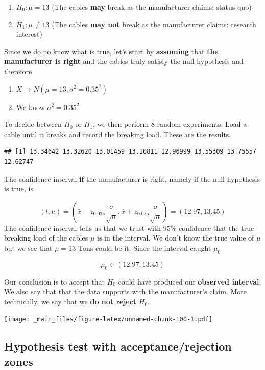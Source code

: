 \documentclass[
]{book}
\providecommand{\tightlist}{%
  \setlength{\itemsep}{0pt}\setlength{\parskip}{0pt}}
\begin{document}
\begin{enumerate}
\def\labelenumi{\alph{enumi}.}
\tightlist
\item
  \(H_0:\mu = 13\) (The cables \textbf{may} break as the manufacturer claims: status quo)
\item
  \(H_1:\mu \neq 13\) (The cables \textbf{may not} break as the manufacturer claims: research interest)
\end{enumerate}

Since we do no know what is true, let's start by \textbf{assuming} that \textbf{the manufacturer is right} and the cables truly satisfy the null hypothesis and therefore

\begin{enumerate}
\def\labelenumi{\arabic{enumi}.}
\tightlist
\item
  \(X \rightarrow N(\mu=13, \sigma^2=0.35^2)\)
\item
  We know \(\sigma^2=0.35^2\)
\end{enumerate}

To decide between \(H_0\) or \(H_1\), we then perform \(8\) random experiments: Load a cable until it breaks and record the breaking load. These are the results.

\begin{verbatim}
## [1] 13.34642 13.32620 13.01459 13.10811 12.96999 13.55309 13.75557 12.62747
\end{verbatim}

The confidence interval \textbf{if} the manufacturer is right, namely if the null hypothesis is true, is

\[(l,u)=(\bar{x}-z_{0.025} \frac{\sigma}{\sqrt{n}}, \bar{x}+z_{0.025} \frac{\sigma}{\sqrt{n}})= (12.97,13.45)\]
The confidence interval tells us that we trust with \(95\%\) confidence that the true breaking load of the cables \(\mu\) is in the interval. We don't know the true value of \(\mu\) but we see that \(\mu=13\) Tons could be it. Since the interval caught \(\mu_0\)

\[\mu_0\in (12.97,13.45)\]

Our conclusion is to accept that \(H_0\) could have produced our \textbf{observed interval}. We also say that that the data supports with the manufacturer's claim. More technically, we say that we \textbf{do not reject} \(H_0\).

\texttt{[image: \_main\_files/figure-latex/unnamed-chunk-100-1.pdf]}

\hypertarget{hypothesis-test-with-acceptancerejection-zones}{%
\subsection{Hypothesis test with acceptance/rejection zones}\label{hypothesis-test-with-acceptancerejection-zones}}
\end{document}
